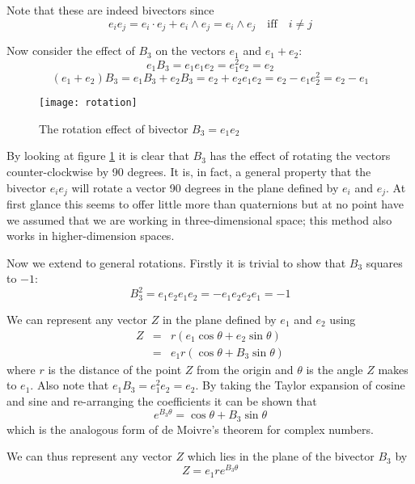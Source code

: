 Note that these are indeed bivectors since
\[
e_ie_j = e_i \cdot e_j + e_i \wedge e_j = e_i \wedge e_j \quad \mbox{iff} \quad i \ne j
\]

Now consider the effect of $B_3$ on the vectors $e_1$ and $e_1 + e_2$:
\begin{displaymath}
e_1B_3 = e_1e_1e_2 = e_1^2e_2=e_2 
\end{displaymath}
\begin{displaymath}
(e_1 + e_2)B_3 = e_1B_3 + e_2B_3 = e_2 + e_2e_1e_2 = e_2 - e_1e_2^2 = e_2 - e_1
\end{displaymath}

\begin{figure}
\centering
\texttt{[image: rotation]}
\caption{The rotation effect of bivector $B_3 = e_1e_2$\label{fig:rotation}}
\end{figure}

By looking at figure \ref{fig:rotation} it is clear that $B_3$ has the
effect of rotating the vectors counter-clockwise by 90 degrees. It is, in
fact, a general property that the bivector $e_ie_j$ will rotate a
vector 90 degrees in the plane defined by $e_i$ and $e_j$. At first 
glance this seems to offer little more than quaternions but at no point 
have we assumed that we are working in three-dimensional space; this method
also works in higher-dimension spaces.

Now we extend to general rotations. Firstly it is trivial to
show that $B_3$ squares to $-1$:
\begin{displaymath}
B_3^2 = e_1e_2e_1e_2 = -e_1e_2e_2e_1 = -1
\end{displaymath}

We can represent any vector $Z$ in the plane defined by $e_1$ and
$e_2$ using
\begin{eqnarray*}
Z & = & r ( e_1 \cos \theta + e_2 \sin \theta) \\
  & = & e_1 r ( \cos \theta + B_3 \sin \theta)
\end{eqnarray*}
where $r$ is the distance of the point $Z$ from the origin
and $\theta$ is the angle $Z$ makes to $e_1$. Also note
that $e_1B_3 = e_1^2e_2 = e_2$. By taking the Taylor expansion of cosine
and sine and re-arranging the coefficients it can be shown that
\[
e^{B_3\theta} = \cos \theta + B_3 \sin \theta
\]
which is the analogous form of de Moivre's theorem for complex
numbers.

We can thus represent any vector $Z$ which lies in the plane of the
bivector $B_3$ by
\[
Z=e_1re^{B_3\theta}
\]

